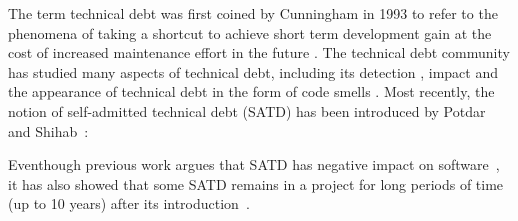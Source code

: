 
The term technical debt was first coined by Cunningham in 1993 to refer to the phenomena of taking a shortcut to achieve short term development gain at the cost of increased maintenance effort in the future \cite{Cunningham1992WPM}. The technical debt community has studied many aspects of technical debt, including its detection \cite{Zazworka2013EASE}, impact \cite{Zazworka2011MTD} and the appearance of technical debt in the form of code smells \cite{Fontana2012MTD}. 
Most recently, the notion of self-admitted technical debt (SATD) has been introduced by Potdar and Shihab~\cite{Potdar2014ICSME}: 



Eventhough previous work argues that SATD has negative impact on software~\cite{Wehaibi2016SANER,kameiusingTDA2016}, it has also showed that some SATD remains in a project for long periods of time (up to 10 years) after its introduction~\cite{Potdar2014ICSME}. 

